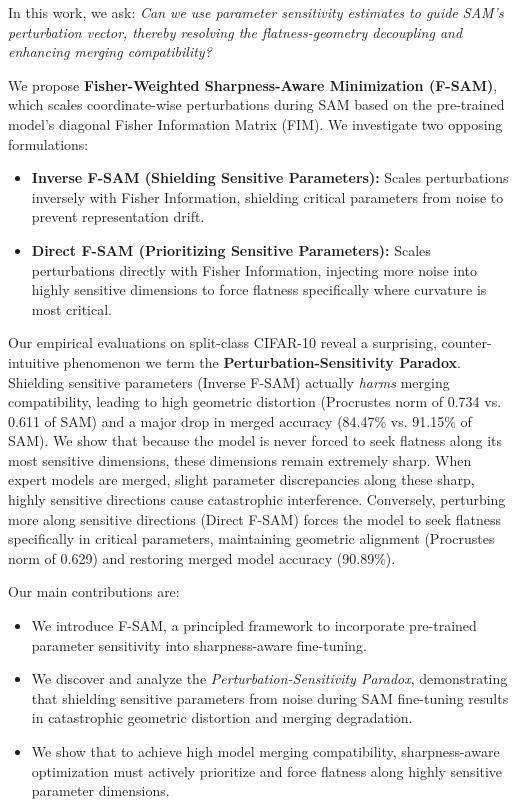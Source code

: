 \documentclass{article}
\theoremstyle{plain}
\theoremstyle{definition}
\theoremstyle{remark}
\begin{document}
In this work, we ask: \textit{Can we use parameter sensitivity estimates to guide SAM's perturbation vector, thereby resolving the flatness-geometry decoupling and enhancing merging compatibility?}

We propose \textbf{Fisher-Weighted Sharpness-Aware Minimization (F-SAM)}, which scales coordinate-wise perturbations during SAM based on the pre-trained model's diagonal Fisher Information Matrix (FIM). We investigate two opposing formulations:
\begin{itemize}\setlength{\itemsep}{0pt}\setlength{\parskip}{0pt}\setlength{\parsep}{0pt}
    \item \textbf{Inverse F-SAM (Shielding Sensitive Parameters):} Scales perturbations inversely with Fisher Information, shielding critical parameters from noise to prevent representation drift.
    \item \textbf{Direct F-SAM (Prioritizing Sensitive Parameters):} Scales perturbations directly with Fisher Information, injecting more noise into highly sensitive dimensions to force flatness specifically where curvature is most critical.
\end{itemize}

Our empirical evaluations on split-class CIFAR-10 reveal a surprising, counter-intuitive phenomenon we term the \textbf{Perturbation-Sensitivity Paradox}. Shielding sensitive parameters (Inverse F-SAM) actually \textit{harms} merging compatibility, leading to high geometric distortion (Procrustes norm of 0.734 vs. 0.611 of SAM) and a major drop in merged accuracy (84.47\% vs. 91.15\% of SAM). We show that because the model is never forced to seek flatness along its most sensitive dimensions, these dimensions remain extremely sharp. When expert models are merged, slight parameter discrepancies along these sharp, highly sensitive directions cause catastrophic interference. Conversely, perturbing more along sensitive directions (Direct F-SAM) forces the model to seek flatness specifically in critical parameters, maintaining geometric alignment (Procrustes norm of 0.629) and restoring merged model accuracy (90.89\%).

Our main contributions are:
\begin{itemize}\setlength{\itemsep}{0pt}\setlength{\parskip}{0pt}\setlength{\parsep}{0pt}
    \item We introduce F-SAM, a principled framework to incorporate pre-trained parameter sensitivity into sharpness-aware fine-tuning.
    \item We discover and analyze the \textit{Perturbation-Sensitivity Paradox}, demonstrating that shielding sensitive parameters from noise during SAM fine-tuning results in catastrophic geometric distortion and merging degradation.
    \item We show that to achieve high model merging compatibility, sharpness-aware optimization must actively prioritize and force flatness along highly sensitive parameter dimensions.
\end{itemize}
\end{document}
